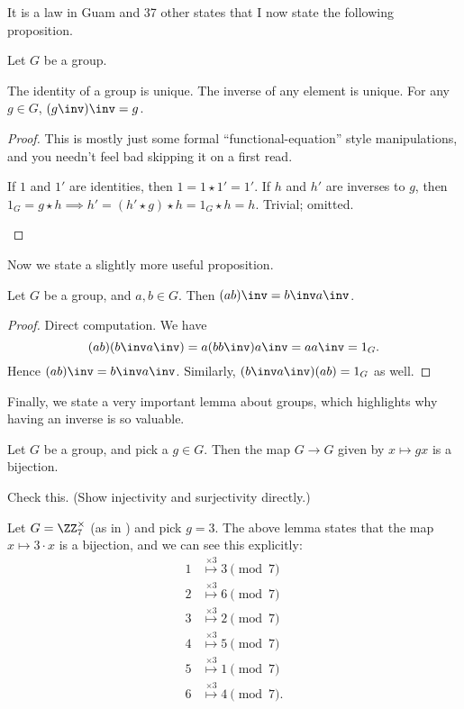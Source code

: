 It is a law in Guam and 37 other states that I now state the following proposition.
\begin{fact}
	Let $G$ be a group.
	\begin{enumerate}[(a)]
		\ii The identity of a group is unique.
		\ii The inverse of any element is unique.
		\ii For any $g \in G$, $(g\inv)\inv = g$.
	\end{enumerate}
\end{fact}
\begin{proof}
	This is mostly just some formal ``functional-equation'' style manipulations,
	and you needn't feel bad skipping it on a first read.
	\begin{enumerate}[(a)]
		\ii If $1$ and $1'$ are identities, then $1 = 1 \star 1' = 1'$.
		\ii If $h$ and $h'$ are inverses to $g$, then $1_G = g \star h
		\implies h' = (h' \star g) \star h = 1_G \star h = h$.
		\ii Trivial; omitted. \qedhere
	\end{enumerate}
\end{proof}

Now we state a slightly more useful proposition.
\begin{proposition}
	Let $G$ be a group, and $a,b \in G$.
	Then $(ab)\inv = b\inv a\inv$.
\end{proposition}
\begin{proof}
	Direct computation. We have
	\[ (ab)(b\inv a\inv)
		= a (bb\inv) a\inv = aa\inv = 1_G. \]
	Hence $(ab)\inv = b\inv a\inv$.
	Similarly, $(b\inv a\inv)(ab) = 1_G$ as well.
\end{proof}

Finally, we state a very important lemma about groups,
which highlights why having an inverse is so valuable.
\begin{lemma}
	Let $G$ be a group, and pick a $g \in G$. 
	Then the map $G \to G$ given by
	$x \mapsto gx$
	is a bijection.
	\label{lem:group_mult_biject}
\end{lemma}
\begin{exercise}
	Check this. (Show injectivity and surjectivity directly.)
\end{exercise}
\begin{example}
	Let $G = \Zm 7$ (as in ) and pick $g=3$.
	The above lemma states that the map $x \mapsto 3 \cdot x$ is a bijection, and we can see this explicitly:
	\begin{align*}
		1 &\overset{\times 3}{\longmapsto} 3 \pmod 7 \\
		2 &\overset{\times 3}{\longmapsto} 6 \pmod 7 \\
		3 &\overset{\times 3}{\longmapsto} 2 \pmod 7 \\
		4 &\overset{\times 3}{\longmapsto} 5 \pmod 7 \\
		5 &\overset{\times 3}{\longmapsto} 1 \pmod 7 \\
		6 &\overset{\times 3}{\longmapsto} 4 \pmod 7.
	\end{align*}
\end{example}


